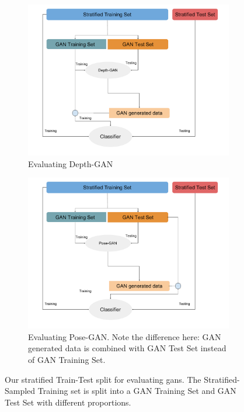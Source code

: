 \begin{figure}[h!]
	\centering
	\begin{subfigure}{\textwidth}
		\centering
		\includegraphics[width=0.8\linewidth]{img/gan_train_test_split_depth}
		\caption{Evaluating Depth-GAN}
		\label{subfig:depth_gan_split}
	\end{subfigure}
	\begin{subfigure}{\textwidth}
		\centering
		\includegraphics[width=0.8\linewidth]{img/gan_train_test_split_pose}
		\caption{Evaluating Pose-GAN. Note the difference here: GAN
		generated data is combined with GAN Test Set instead of GAN Training Set.}
		\label{subfig:pose_gan_split}
	\end{subfigure}

	\caption{Our stratified Train-Test split for evaluating \acrshort{gan}s. The
	Stratified-Sampled Training set is split into a GAN Training Set and GAN Test Set with
different proportions.}
\label{fig:gan_train_test_split}
\end{figure}

